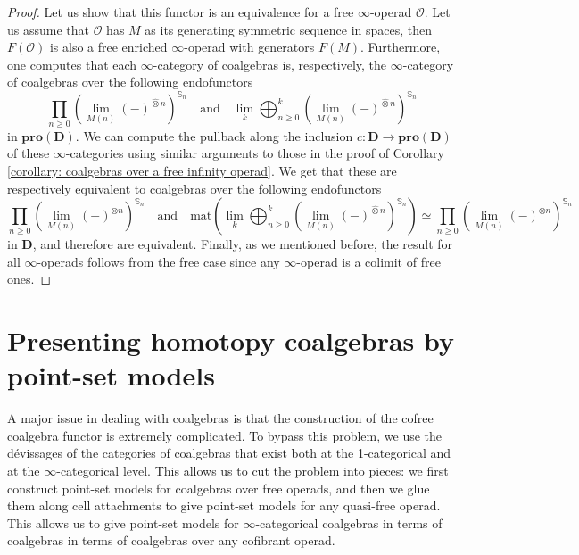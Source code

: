 \documentclass{proc-l}
\theoremstyle{plain}
\theoremstyle{definition}
\theoremstyle{remark}
\begin{document}
\begin{proof}
Let us show that this functor is an equivalence for a free $\infty$-operad $\mathscr{O}$. Let us assume that $\mathscr{O}$ has $M$ as its generating symmetric sequence in spaces, then $F(\mathscr{O})$ is also a free enriched $\infty$-operad with generators $F(M)$. Furthermore, one computes that each $\infty$-category of coalgebras is, respectively, the $\infty$-category of coalgebras over the following endofunctors
\[
\prod_{n \geq 0} \left(\lim_{M(n)} (-)^{\widehat{\otimes} n} \right)^{\mathbb{S}_n} \quad \text{and} \quad
\lim_k\bigoplus_{n \geq 0}^{k}  \left(\lim_{M(n)} (-)^{\widehat{\otimes} n}\right)^{\mathbb{S}_n}
\]
in $\mathbf{pro}(\mathbf{D})$. We can compute the pullback along the inclusion $c: \mathbf{D} \longrightarrow \mathbf{pro}(\mathbf{D})$ of these $\infty$-categories using similar arguments to those in the proof of Corollary \ref{corollary: coalgebras over a free infinity operad}. We get that these are respectively equivalent to coalgebras over the following endofunctors
\[
\prod_{n \geq 0} \left(\lim_{M(n)} (-)^{\otimes n} \right)^{\mathbb{S}_n} \quad \text{and} \quad
\mathrm{mat}\left(\lim_k\bigoplus_{n \geq 0}^{k}  \left(\lim_{M(n)} (-)^{\widehat{\otimes} n}\right)^{\mathbb{S}_n} \right) \simeq \prod_{n \geq 0} \left(\lim_{M(n)} (-)^{\otimes n} \right)^{\mathbb{S}_n}
\]
in $\mathbf{D}$, and therefore are equivalent. Finally, as we mentioned before, the result for all $\infty$-operads follows from the free case since any $\infty$-operad is a colimit of free ones.
\end{proof}

\vspace{1pc}

\section{Presenting homotopy coalgebras by point-set models}%
\label{Section:4}

\vspace{2.5pc}

A major issue in dealing with coalgebras is that the construction of the cofree coalgebra functor is extremely complicated. To bypass this problem, we use the d{\'{e}}vissages of the categories of coalgebras that exist both at the 1-categorical and at the $\infty$-categorical level. This allows us to cut the problem into pieces: we first construct point-set models for coalgebras over free operads, and then we glue them along cell attachments to give point-set models for any quasi-free operad. This allows us to give point-set models for $\infty$-categorical coalgebras in terms of coalgebras in terms of coalgebras over any cofibrant operad.
\end{document}
